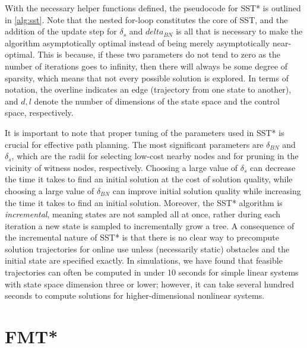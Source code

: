 With the necessary helper functions defined, the pseudocode for SST* is outlined in \autoref{alg:sst}. Note that the nested for-loop constitutes the core of SST, and the addition of the update step for $\delta_s$ and $delta_{BN}$ is all that is necessary to make the algorithm asymptotically optimal instead of being merely asymptotically near-optimal. This is because, if these two parameters do not tend to zero as the number of iterations goes to infinity, then there will always be some degree of sparsity, which means that not every possible solution is explored. In terms of notation, the overline indicates an edge (trajectory from one state to another), and $d, l$ denote the number of dimensions of the state space and the control space, respectively.


It is important to note that proper tuning of the parameters used in SST* is crucial for effective path planning. The most significant parameters are $\delta_{BN}$ and $\delta_s$, which are the radii for selecting low-cost nearby nodes and for pruning in the vicinity of witness nodes, respectively. Choosing a large value of $\delta_s$ can decrease the time it takes to find an initial solution at the cost of solution quality, while choosing a large value of $\delta_{BN}$ can improve initial solution quality while increasing the time it takes to find an initial solution. Moreover, the SST* algorithm is \emph{incremental}, meaning states are not sampled all at once, rather during each iteration a new state is sampled to incrementally grow a tree. A consequence of the incremental nature of SST* is that there is no clear way to precompute solution trajectories for online use unless (necessarily static) obstacles and the initial state are specified exactly. In simulations, we have found that feasible trajectories can often be computed in under 10 seconds for simple linear systems with state space dimension three or lower; however, it can take several hundred seconds to compute solutions for higher-dimensional nonlinear systems.




\section{FMT*}


